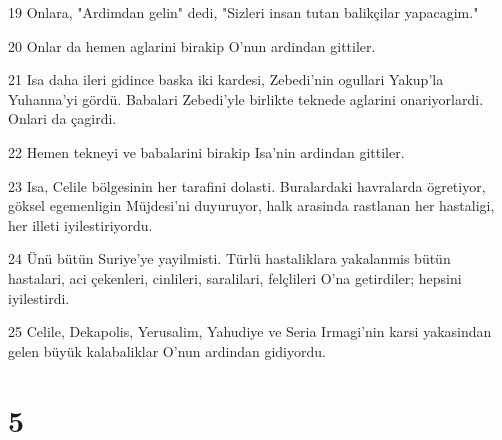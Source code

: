 \par 19 Onlara, "Ardimdan gelin" dedi, "Sizleri insan tutan balikçilar yapacagim."
\par 20 Onlar da hemen aglarini birakip O'nun ardindan gittiler.
\par 21 Isa daha ileri gidince baska iki kardesi, Zebedi'nin ogullari Yakup'la Yuhanna'yi gördü. Babalari Zebedi'yle birlikte teknede aglarini onariyorlardi. Onlari da çagirdi.
\par 22 Hemen tekneyi ve babalarini birakip Isa'nin ardindan gittiler.
\par 23 Isa, Celile bölgesinin her tarafini dolasti. Buralardaki havralarda ögretiyor, göksel egemenligin Müjdesi'ni duyuruyor, halk arasinda rastlanan her hastaligi, her illeti iyilestiriyordu.
\par 24 Ünü bütün Suriye'ye yayilmisti. Türlü hastaliklara yakalanmis bütün hastalari, aci çekenleri, cinlileri, saralilari, felçlileri O'na getirdiler; hepsini iyilestirdi.
\par 25 Celile, Dekapolis, Yerusalim, Yahudiye ve Seria Irmagi'nin karsi yakasindan gelen büyük kalabaliklar O'nun ardindan gidiyordu.

\chapter{5}

